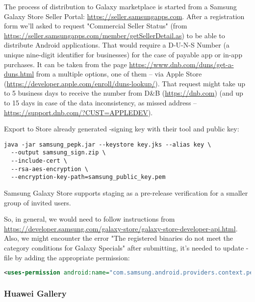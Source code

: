 The process of distribution to Galaxy marketplace is started from a Samsung Galaxy Store Seller Portal:
\href{https://seller.samsungapps.com}{https://seller.samsungapps.com}.
After a registration form we'll asked to request "Commercial Seller Status" (from 
\href{https://seller.samsungapps.com/member/getSellerDetail.as}{https://seller.samsungapps.com/member/getSellerDetail.as})
to be able to distribute Android applications. That would require a D-U-N-S Number (a unique nine-digit identifier for 
businesses) for the case of payable app or in-app purchases. It can be taken from the page 
\href{https://www.dnb.com/duns/get-a-duns.html}{ https://www.dnb.com/duns/get-a-duns.html}
from a multiple options, one of them -- via Apple Store 
(\href{https://developer.apple.com/enroll/duns-lookup/}{https://developer.apple.com/enroll/duns-lookup/}).
That request might take up to 5 business days to receive the number from D\&B (\href{https://dnb.com}{https://dnb.com})
(and up to 15 days in case of the data inconsistency, as missed address -- 
\href{https://support.dnb.com/?CUST=APPLEDEV}{https://support.dnb.com/?CUST=APPLEDEV}). 

Export to Store already generated -signing key with their tool and public key:

\begin{lstlisting}[language=terminal]
java -jar samsung_pepk.jar --keystore key.jks --alias key \
  --output samsung_sign.zip \
  --include-cert \
  --rsa-aes-encryption \
  --encryption-key-path=samsung_public_key.pem
\end{lstlisting}

\noindent Samsung Galaxy Store supports staging as a pre-release verification for a smaller group of invited users.

So, in general, we would need to follow instructions  from 
\href{https://developer.samsung.com/galaxy-store/galaxy-store-developer-api.html}{https://developer.samsung.com/galaxy-store/galaxy-store-developer-api.html}.
Also, we might encounter the error "The registered binaries do not meet the category conditions for Galaxy Specials" 
after submitting, it's needed to update -file by adding the appropriate permission:

\begin{lstlisting}[language=xml]
<uses-permission android:name="com.samsung.android.providers.context.permission.WRITE_USE_APP_FEATURE_SURVEY"/>
\end{lstlisting}


\subsubsection{Huawei Gallery}

